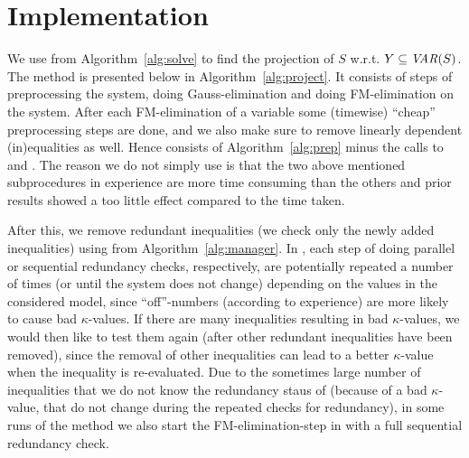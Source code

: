 \section{Implementation}\label{sec:implementation}
We use  from Algorithm~\ref{alg:solve} to find the projection of $S$ w.r.t. $Y\subseteq \mathit{VAR}(S)$. The method  is presented below in Algorithm~\ref{alg:project}. It consists of steps of preprocessing the system, doing Gauss-elimination and doing FM-elimination on the system. After each FM-elimination of a variable some (timewise) ``cheap'' preprocessing steps are done, and we also make sure to remove linearly dependent (in)equalities as well. 
Hence  consists of %
Algorithm~\ref{alg:prep} minus the calls to  and .
The reason we do not simply use  is that the two above mentioned subprocedures in experience 
are more time consuming than the others and prior results showed a too little effect compared to the time taken.

After this, we remove redundant inequalities (we check only the newly added inequalities) using  from Algorithm~\ref{alg:manager}. 
In , each step of doing parallel or sequential redundancy checks, respectively, are potentially repeated a number of times (or until the system does not change) depending on the values in the considered model, since ``off''-numbers (according to experience) are more likely to cause bad $\kappa$-values. If there are many inequalities resulting in bad $\kappa$-values, we would then like to test them again (after other redundant inequalities have been removed), since the removal of other inequalities can lead to a better $\kappa$-value when the inequality is re-evaluated.    
Due to the sometimes large number of inequalities that we do not know the redundancy staus of (because of a bad $\kappa$-value, that do not change during the repeated checks for redundancy), in some runs of the method we also start the FM-elimination-step in  with a full sequential redundancy check.

